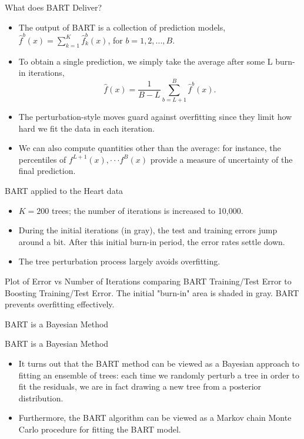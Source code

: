 \documentclass[aspectratio=169, 11pt]{beamer}
\begin{document}
\begin{frame}{What does BART Deliver?}
\begin{itemize}
    \item The output of BART is a collection of prediction models, $\hat{f}^{b}(x)=\sum_{k=1}^{K}\hat{f}_{k}^{b}(x)$, for $b=1,2,...,B$.
    \item To obtain a single prediction, we simply take the average after some L burn-in iterations, 
    \begin{equation*}
    \hat{f}(x)=\frac{1}{B-L}\sum_{b=L+1}^{B}\hat{f}^{b}(x).
    \end{equation*}
    \item The perturbation-style moves guard against overfitting since they limit how hard we fit the data in each iteration.
    \item We can also compute quantities other than the average: for instance, the percentiles of $f^{L+1}(x),\cdot\cdot\cdot f^{B}(x)$ provide a measure of uncertainty of the final prediction.
\end{itemize}
\end{frame}

\begin{frame}{BART applied to the Heart data}
\begin{itemize}
    \item $K=200$ trees; the number of iterations is increased to 10,000.
    \item During the initial iterations (in gray), the test and training errors jump around a bit. After this initial burn-in period, the error rates settle down.
    \item The tree perturbation process largely avoids overfitting.
\end{itemize}
\begin{tcolorbox}[colback=LightGray,title=Figure]
Plot of Error vs Number of Iterations comparing BART Training/Test Error to Boosting Training/Test Error. The initial "burn-in" area is shaded in gray. BART prevents overfitting effectively.
\end{tcolorbox}
\end{frame}

\begin{frame}{BART is a Bayesian Method}
\end{frame}

\begin{frame}{BART is a Bayesian Method}
\begin{itemize}
    \item It turns out that the BART method can be viewed as a Bayesian approach to fitting an ensemble of trees: each time we randomly perturb a tree in order to fit the residuals, we are in fact drawing a new tree from a posterior distribution.
    \item Furthermore, the BART algorithm can be viewed as a Markov chain Monte Carlo procedure for fitting the BART model.
\end{itemize}
\end{frame}
\end{document}

